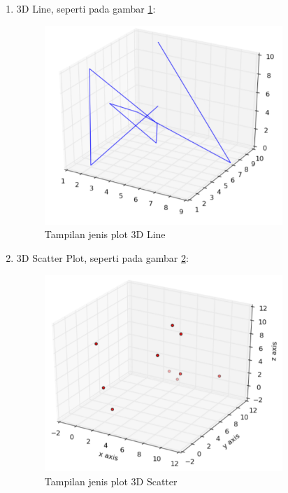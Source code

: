 \begin{enumerate}
\item 3D Line, seperti pada gambar \ref{fig:3dline}:
\begin{figure}[!htbp]
	\centerline{\includegraphics[width=0.85\textwidth]{figures/6/3dline.PNG}}
	\caption{Tampilan jenis plot 3D Line}
	\label{fig:3dline}
\end{figure}

\item 3D Scatter Plot, seperti pada gambar \ref{fig:3dscatter}:
\begin{figure}[!htbp]
	\centerline{\includegraphics[width=0.85\textwidth]{figures/6/3dscatter.PNG}}
	\caption{Tampilan jenis plot 3D Scatter}
	\label{fig:3dscatter}
\end{figure}


\end{enumerate}
